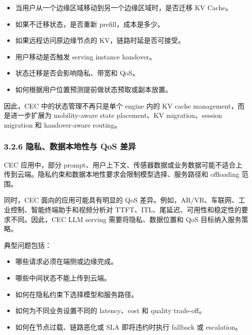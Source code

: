 \documentclass[a4paper,twocolumn,10pt]{ctexart}
\begin{document}
\begin{itemize}
\item 当用户从一个边缘区域移动到另一个边缘区域时，是否迁移 KV Cache。

\item 如果不迁移状态，是否重新 prefill，成本是多少。

\item 如果远程访问原边缘节点的 KV，链路时延是否可接受。

\item 用户移动是否触发 serving instance handover。

\item 状态迁移是否会影响隐私、带宽和 QoS。

\item 如何根据用户位置预测提前做状态预取或副本放置。



\end{itemize}
因此，CEC 中的状态管理不再只是单个 engine 内的 KV cache management，而是进一步扩展为 mobility-aware state placement、KV migration、session migration 和 handover-aware routing。








\subsubsection{3.2.6 隐私、数据本地性与 QoS 差异}



CEC 应用中，部分 prompt、用户上下文、传感器数据或业务数据可能不适合上传到云端。隐私约束和数据本地性要求会限制模型选择、服务路径和 offloading 范围。




同时，CEC 面向的应用可能具有明显的 QoS 差异。例如，AR/VR、车联网、工业控制、智能终端助手和视频分析对 TTFT、ITL、尾延迟、可用性和稳定性的要求不同。因此，CEC LLM serving 需要将隐私、数据位置和 QoS 目标纳入服务策略。




典型问题包括：




\begin{itemize}
\item 哪些请求必须在端侧或边缘完成。

\item 哪些中间状态不能上传到云端。

\item 如何在隐私约束下选择模型和服务路径。

\item 如何为不同业务设置不同的 latency、cost 和 quality trade-off。

\item 如何在节点过载、链路恶化或 SLA 即将违约时执行 fallback 或 escalation。



\end{itemize}
\end{document}
